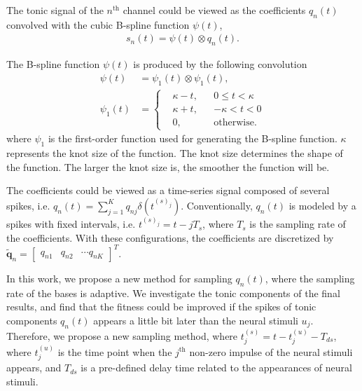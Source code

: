 \documentclass[10pt,conference]{ieeeconf}
\begin{document}
The tonic signal of the $n^{\mathrm{th}}$ channel could be viewed as the coefficients $q_n (t)$ convolved with the cubic B-spline function $\psi(t)$,
\begin{align} \label{fml:tonic-conv}
s_n(t) =  \psi(t) \otimes q_n (t).
\end{align}

The B-spline function $\psi(t)$ is produced by the following convolution
\begin{subequations}
  \renewcommand{\theequation}
  {\theparentequation-\arabic{equation}}
  \begin{align}
    \psi(t) &= \psi_1 (t) \otimes \psi_1 (t), \\
    \psi_1(t) &= \left\{\begin{aligned}
      &\kappa - t, && 0 \leqslant t < \kappa  \\
      &\kappa + t, && -\kappa < t < 0 \\
      &0, && \text{otherwise}.
    \end{aligned}\right.
  \end{align}
\end{subequations}
where $\psi_1$ is the first-order function used for generating the B-spline function. $\kappa$ represents the knot size of the function. The knot size determines the shape of the function. The larger the knot size is, the smoother the function will be. 

The coefficients could be viewed as a time-series signal composed of several spikes, i.e. $q_n (t) = \sum_{j=1}^K q_{nj} \delta(t^{(s)_j})$. Conventionally, $q_n(t)$ is modeled by a spikes with fixed intervals, i.e. $t^{(s)_j} = t - jT_s$, where $T_s$ is the sampling rate of the coefficients. With these configurations, the coefficients are discretized by $\tilde{\mathbf{q}}_n = \begin{bmatrix}
q_{n1} & q_{n2} & \cdots q_{nK}
\end{bmatrix}^T$.

In this work, we propose a new method for sampling $q_{n}(t)$, where the sampling rate of the bases is adaptive. We investigate the tonic components of the final results, and find that the fitness could be improved if the spikes of tonic components $q_n(t)$ appears a little bit later than the neural stimuli $u_j$. Therefore, we propose a new sampling method, where $t^{(s)}_j = t - t^{(u)}_j - T_{ds}$, where $t^{(u)}_j$ is the time point when the $j^{\mathrm{th}}$ non-zero impulse of the neural stimuli appears, and $T_{ds}$ is a pre-defined delay time related to the appearances of neural stimuli.
\end{document}
